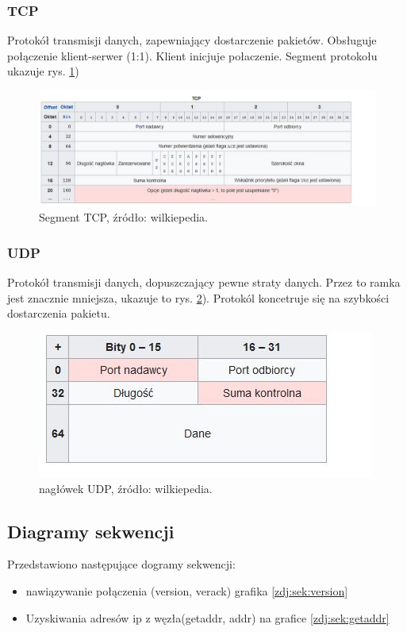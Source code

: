 \documentclass[a4paper,polish,12pt]{article}
\begin{document}
\subsubsection{TCP}
Protokół transmisji danych, zapewniający dostarczenie pakietów. Obsługuje połączenie klient-serwer (1:1). Klient inicjuje połaczenie. Segment protokołu ukazuje rys. \ref{zdj:3})
\begin{figure}
\label{zdj:3}
\centering
\includegraphics[width=\textwidth]{2.jpg}
\caption { Segment TCP, źródło: wilkiepedia.}
\end{figure}

\subsubsection{UDP}
Protokół transmisji danych,  dopuszczający pewne straty danych. Przez to ramka jest znacznie mniejsza, ukazuje to rys. \ref{zdj:4}). Protokól koncetruje się na szybkości dostarczenia pakietu.
\begin{figure}
\label{zdj:4}
\centering
\includegraphics[width=\textwidth]{3.jpg}
\caption { nagłówek UDP, źródło: wilkiepedia.}
\end{figure}
\subsection{Diagramy sekwencji}
Przedstawiono następujące dogramy sekwencji:
\begin{itemize}
\item nawiązywanie połączenia (version, verack) grafika \ref{zdj:sek:version}
\item Uzyskiwania adresów ip z węzła(getaddr, addr) na grafice \ref{zdj:sek:getaddr}
\end{itemize}
\end{document}
